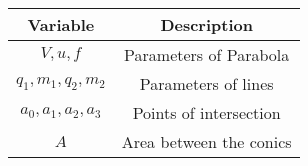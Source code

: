 \begin{tabular}[12pt]{ |c| c|}
    \hline
    \textbf{Variable} & \textbf{Description}\\ 
    \hline
    $V,u,f$ & Parameters of Parabola \\
    \hline 
    $q_1,m_1,q_2,m_2$ & Parameters of lines \\
    \hline
     $a_0,a_1,a_2,a_3$ & Points of intersection \\
     \hline
     $A$ & Area between the conics \\
    \hline
\end{tabular}
